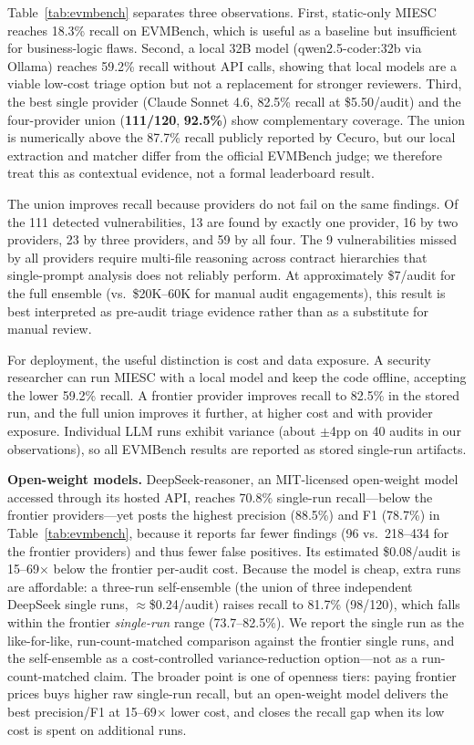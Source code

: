 \documentclass[conference]{IEEEtran}
\begin{document}
Table~\ref{tab:evmbench} separates three observations. First, static-only MIESC reaches 18.3\% recall on EVMBench, which is useful as a baseline but insufficient for business-logic flaws. Second, a local 32B model (qwen2.5-coder:32b via Ollama) reaches 59.2\% recall without API calls, showing that local models are a viable low-cost triage option but not a replacement for stronger reviewers. Third, the best single provider (Claude Sonnet 4.6, 82.5\% recall at \$5.50/audit) and the four-provider union (\textbf{111/120}, \textbf{92.5\%}) show complementary coverage. The union is numerically above the 87.7\% recall publicly reported by Cecuro, but our local extraction and matcher differ from the official EVMBench judge; we therefore treat this as contextual evidence, not a formal leaderboard result.

The union improves recall because providers do not fail on the same findings. Of the 111 detected vulnerabilities, 13 are found by exactly one provider, 16 by two providers, 23 by three providers, and 59 by all four. The 9 vulnerabilities missed by all providers require multi-file reasoning across contract hierarchies that single-prompt analysis does not reliably perform. At approximately \$7/audit for the full ensemble (vs.\ \$20K--60K for manual audit engagements), this result is best interpreted as pre-audit triage evidence rather than as a substitute for manual review.

For deployment, the useful distinction is cost and data exposure. A security researcher can run MIESC with a local model and keep the code offline, accepting the lower 59.2\% recall. A frontier provider improves recall to 82.5\% in the stored run, and the full union improves it further, at higher cost and with provider exposure. Individual LLM runs exhibit variance (about $\pm$4pp on 40 audits in our observations), so all EVMBench results are reported as stored single-run artifacts.

\textbf{Open-weight models.} DeepSeek-reasoner, an MIT-licensed open-weight model accessed through its hosted API, reaches 70.8\% single-run recall---below the frontier providers---yet posts the highest precision (88.5\%) and F1 (78.7\%) in Table~\ref{tab:evmbench}, because it reports far fewer findings (96 vs.\ 218--434 for the frontier providers) and thus fewer false positives. Its estimated \$0.08/audit is 15--69$\times$ below the frontier per-audit cost. Because the model is cheap, extra runs are affordable: a three-run self-ensemble (the union of three independent DeepSeek single runs, $\approx$\$0.24/audit) raises recall to 81.7\% (98/120), which falls within the frontier \emph{single-run} range (73.7--82.5\%). We report the single run as the like-for-like, run-count-matched comparison against the frontier single runs, and the self-ensemble as a cost-controlled variance-reduction option---not as a run-count-matched claim. The broader point is one of openness tiers: paying frontier prices buys higher raw single-run recall, but an open-weight model delivers the best precision/F1 at 15--69$\times$ lower cost, and closes the recall gap when its low cost is spent on additional runs.
\end{document}
